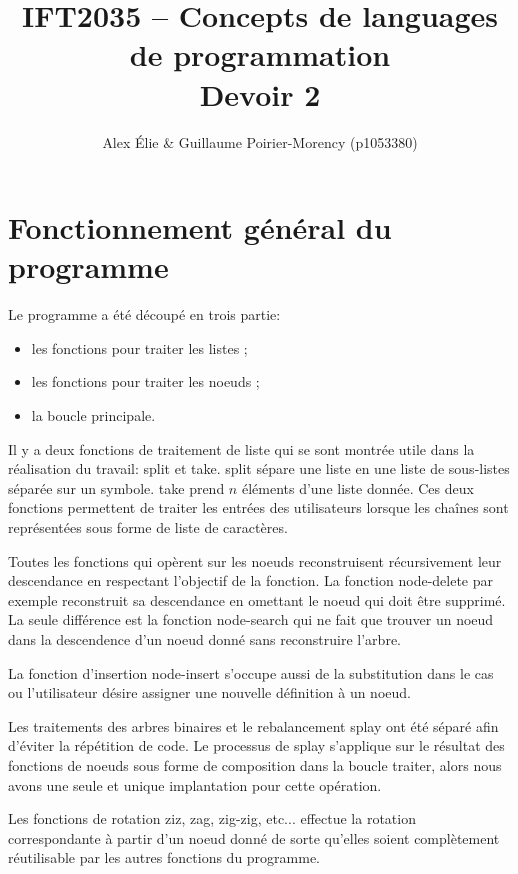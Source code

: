 \documentclass{article}
\title{IFT2035 -- Concepts de languages de programmation \\ Devoir 2}
\author{Alex Élie \& Guillaume Poirier-Morency (p1053380)}
\begin{document}
  \maketitle

  \abstract

  \section{Fonctionnement général du programme}

  Le programme a été découpé en trois partie:
  \begin{itemize}
    \item les fonctions pour traiter les listes ;
    \item les fonctions pour traiter les noeuds ;
    \item la boucle principale.
  \end{itemize}

  Il y a deux fonctions de traitement de liste qui se sont montrée utile dans la
  réalisation du travail: \textsf{split} et \textsf{take}. \textsf{split} sépare
  une liste en une liste de sous-listes séparée sur un symbole. \textsf{take}
  prend $n$ éléments d'une liste donnée. Ces deux fonctions permettent de
  traiter les entrées des utilisateurs lorsque les chaînes sont représentées
  sous forme de liste de caractères.

  Toutes les fonctions qui opèrent sur les noeuds reconstruisent récursivement
  leur descendance en respectant l'objectif de la fonction. La fonction
  \textsf{node-delete} par exemple reconstruit sa descendance en omettant le
  noeud qui doit être supprimé. La seule différence est la fonction
  \textsf{node-search} qui ne fait que trouver un noeud dans la descendence d'un
  noeud donné sans reconstruire l'arbre.

  La fonction d'insertion \textsf{node-insert} s'occupe aussi de la substitution
  dans le cas ou l'utilisateur désire assigner une nouvelle définition à un
  noeud.

  Les traitements des arbres binaires et le rebalancement splay ont été séparé
  afin d'éviter la répétition de code. Le processus de splay s'applique sur le
  résultat des fonctions de noeuds sous forme de composition dans la boucle
  \textsf{traiter}, alors nous avons une seule et unique implantation pour cette
  opération.

  Les fonctions de rotation \textsf{ziz}, \textsf{zag}, \textsf{zig-zig}, etc...
  effectue la rotation correspondante à partir d'un noeud donné de sorte
  qu'elles soient complètement réutilisable par les autres fonctions du
  programme.
\end{document}
